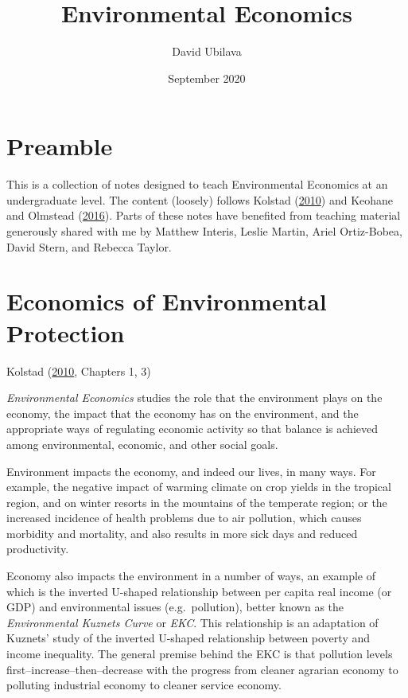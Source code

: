 \documentclass[
]{book}
\title{Environmental Economics}
\author{David Ubilava}
\date{September 2020}
\begin{document}
\maketitle

{
\setcounter{tocdepth}{1}
\tableofcontents
}
\hypertarget{preamble}{%
\chapter*{Preamble}\label{preamble}}

This is a collection of notes designed to teach Environmental Economics at an undergraduate level. The content (loosely) follows Kolstad (\protect\hyperlink{ref-kolstad2010}{2010}) and Keohane and Olmstead (\protect\hyperlink{ref-keohane2016}{2016}). Parts of these notes have benefited from teaching material generously shared with me by Matthew Interis, Leslie Martin, Ariel Ortiz-Bobea, David Stern, and Rebecca Taylor.

\hypertarget{economics-of-environmental-protection}{%
\chapter{Economics of Environmental Protection}\label{economics-of-environmental-protection}}

Kolstad (\protect\hyperlink{ref-kolstad2010}{2010}, Chapters 1, 3)

\emph{Environmental Economics} studies the role that the environment plays on the economy, the impact that the economy has on the environment, and the appropriate ways of regulating economic activity so that balance is achieved among environmental, economic, and other social goals.

Environment impacts the economy, and indeed our lives, in many ways. For example, the negative impact of warming climate on crop yields in the tropical region, and on winter resorts in the mountains of the temperate region; or the increased incidence of health problems due to air pollution, which causes morbidity and mortality, and also results in more sick days and reduced productivity.

Economy also impacts the environment in a number of ways, an example of which is the inverted U-shaped relationship between per capita real income (or GDP) and environmental issues (e.g.~pollution), better known as the \emph{Environmental Kuznets Curve} or \emph{EKC}. This relationship is an adaptation of Kuznets' study of the inverted U-shaped relationship between poverty and income inequality. The general premise behind the EKC is that pollution levels first--increase--then--decrease with the progress from cleaner agrarian economy to polluting industrial economy to cleaner service economy.
\end{document}
